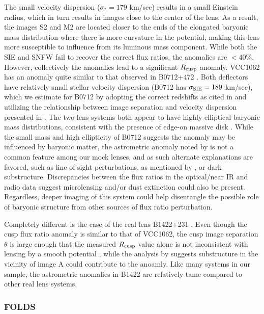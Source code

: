\begin{itemize}
	The small velocity dispersion ($\sigma_* = 179$ km/sec) results in a small Einstein radius, which in turn results in images close to the center of the lens. As a result, the images S2 and M2 are located closer to the ends of the elongated baryonic mass distribution where there is more curvature in the potential, making this lens more susceptible to influence from its luminous mass component. While both the SIE and SNFW fail to recover the correct flux ratios, the anomalies are $<40\%$. However, collectively the anomalies lead to a significant $R_{\rm{cusp}}$ anomaly. VCC1062 has an anomaly quite similar to that observed in B0712+472 \cite{Jackson98}. Both deflectors have relatively small stellar velocity dispersion (B0712 has $\sigma_{\rm{SIE}} = 189$ km/sec), which we estimate for B0712 by adopting the correct redshifts as cited in \cite{COSMOX} and utilizing the relationship between image separation and velocity dispersion presented in \cite{KochanekFPlane}. The two lens systems both appear to have highly elliptical baryonic mass distributions, consistent with the presence of edge-on massive disk \cite{Jackson98}. While the small mass and high ellipticity of B0712 suggests the anomaly may be influenced by baryonic matter, the astrometric anomaly noted by \cite{Kawano++04} is not a common feature among our mock lenses, and as such alternate explanations are favored, such as line of sight perturbations, as mentioned by \cite{F+L02}, or dark substructure. Discrepancies between the flux ratios in the optical/near IR and radio data suggest microlensing and/or dust extinction could also be present. Regardless, deeper imaging of this system could help disentangle the possible role of baryonic structure from other sources of flux ratio perturbation. 
	
	Completely different is the case of the real lens B1422+231 \cite{Patnaik++92}. Even though the cusp flux ratio anomaly is similar to that of VCC1062, the cusp image separation $\theta$ is large enough that the measured $R_{\rm{cusp}}$ value \cite{Koo++03a} alone is not inconsistent with lensing by a smooth potential \cite{KGP03}, while the analysis by \cite{Nie++14,Xuetal2015} suggests substructure in the vicinity of image A could contribute to the anoamly. Like many systems in our sample, the astrometric anomalies in B1422 are relatively tame compared to other real lens systems.
\end{itemize}
\subsubsection{\rm{FOLDS}}

